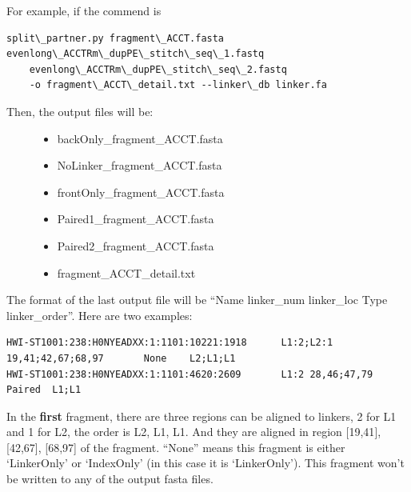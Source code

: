\documentclass[letterpaper,10pt,english]{sphinxmanual}
\begin{document}
For example, if the commend is

\begin{Verbatim}[commandchars=\\\{\}]
split\_partner.py fragment\_ACCT.fasta evenlong\_ACCTRm\_dupPE\_stitch\_seq\_1.fastq
    evenlong\_ACCTRm\_dupPE\_stitch\_seq\_2.fastq
    -o fragment\_ACCT\_detail.txt --linker\_db linker.fa
\end{Verbatim}
\begin{description}
\item[{Then, the output files will be:}] \leavevmode\begin{itemize}
\item {} 
backOnly\_fragment\_ACCT.fasta

\item {} 
NoLinker\_fragment\_ACCT.fasta

\item {} 
frontOnly\_fragment\_ACCT.fasta

\item {} 
Paired1\_fragment\_ACCT.fasta

\item {} 
Paired2\_fragment\_ACCT.fasta

\item {} 
fragment\_ACCT\_detail.txt

\end{itemize}

\end{description}

The format of the last output file  will be ``Name \textbar{} linker\_num \textbar{} linker\_loc \textbar{} Type \textbar{} linker\_order''. Here are two examples:

\begin{Verbatim}[commandchars=\\\{\}]
HWI-ST1001:238:H0NYEADXX:1:1101:10221:1918      L1:2;L2:1  19,41;42,67;68,97       None    L2;L1;L1
HWI-ST1001:238:H0NYEADXX:1:1101:4620:2609       L1:2 28,46;47,79     Paired  L1;L1
\end{Verbatim}

In the \textbf{first} fragment, there are three regions can be aligned to linkers, 2 for L1 and 1 for L2, the order is L2, L1, L1. And they are aligned in region {[}19,41{]}, {[}42,67{]}, {[}68,97{]} of the fragment. ``None'' means this fragment is either `LinkerOnly' or `IndexOnly' (in this case it is `LinkerOnly'). This fragment won't be written to any of the output fasta files.
\end{document}
